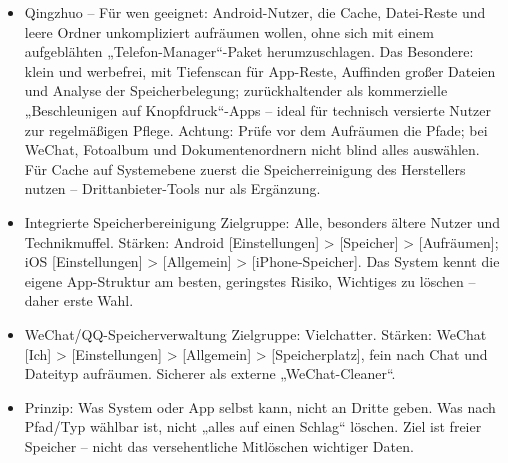 \begin{itemize}
  \item Qingzhuo – Für wen geeignet: Android-Nutzer, die Cache, Datei-Reste und leere Ordner unkompliziert aufräumen wollen, ohne sich mit einem aufgeblähten „Telefon-Manager“-Paket herumzuschlagen. Das Besondere: klein und werbefrei, mit Tiefenscan für App-Reste, Auffinden großer Dateien und Analyse der Speicherbelegung; zurückhaltender als kommerzielle „Beschleunigen auf Knopfdruck“-Apps – ideal für technisch versierte Nutzer zur regelmäßigen Pflege. Achtung: Prüfe vor dem Aufräumen die Pfade; bei WeChat, Fotoalbum und Dokumentenordnern nicht blind alles auswählen. Für Cache auf Systemebene zuerst die Speicherreinigung des Herstellers nutzen – Drittanbieter-Tools nur als Ergänzung.
  \item Integrierte Speicherbereinigung Zielgruppe: Alle, besonders ältere Nutzer und Technikmuffel. Stärken: Android [Einstellungen] > [Speicher] > [Aufräumen]; iOS [Einstellungen] > [Allgemein] > [iPhone-Speicher]. Das System kennt die eigene App-Struktur am besten, geringstes Risiko, Wichtiges zu löschen – daher erste Wahl.
  \item WeChat/QQ-Speicherverwaltung Zielgruppe: Vielchatter. Stärken: WeChat [Ich] > [Einstellungen] > [Allgemein] > [Speicherplatz], fein nach Chat und Dateityp aufräumen. Sicherer als externe „WeChat-Cleaner“.
  \item Prinzip: Was System oder App selbst kann, nicht an Dritte geben. Was nach Pfad/Typ wählbar ist, nicht „alles auf einen Schlag“ löschen. Ziel ist freier Speicher – nicht das versehentliche Mitlöschen wichtiger Daten.
\end{itemize}


